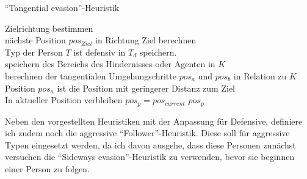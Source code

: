 \begin{algorithm} [H]
	\caption{"`Tangential evasion"'-Heuristik}
	\label{alg:TangentialEvasion}
	
	\TangentialEvasionHeuristic{} {
		Zielrichtung bestimmen \\
		nächste Position $pos_{Ziel}$ in Richtung Ziel berechnen \\
		Typ der Person $T$ ist defensiv in $T_d$ speichern. \\
		 {
			speichern des Bereichs des Hindernisses oder Agenten in $K$ \\
			berechnen der tangentialen Umgehungschritte $pos_a$ und $pos_b$ in Relation zu $K$  \\
			Position $pos_a$ ist die Position mit geringerer Distanz zum Ziel \\
			 {
				 {
					In aktueller Position verbleiben $pos_p = pos_{current}$
				} 
			} 
		} 
		\Return $pos_p$
	}
\end{algorithm}
 
Neben den vorgestellten Heuristiken mit der Anpassung für Defensive, definiere ich zudem noch die aggressive "`Follower"'-Heuristik. Diese soll für aggressive Typen eingesetzt werden, da ich davon ausgehe, dass diese Personen zunächst versuchen die "`Sideways evasion"'-Heuristik zu verwenden, bevor sie beginnen einer Person zu folgen.

